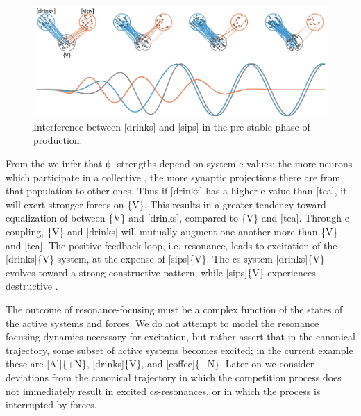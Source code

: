   
\begin{figure}
\includegraphics[width=\textwidth]{figures/Tilsen-img52.png}
\caption{Interference between [drinks] and [sips] in the pre-stable phase of production.}
\label{fig:4:2}
\end{figure}
 

From the  we infer that ϕ{}- strengths depend on system e values: the more neurons which participate in a collective , the more synaptic projections there are from that population to other ones. Thus if [drinks] has a higher e value than [tea], it will exert stronger forces on \{V\}. This results in a greater tendency toward equalization of  between \{V\} and [drinks], compared to \{V\} and [tea]. Through e-coupling, \{V\} and [drinks] will mutually augment one another more than \{V\} and [tea]. The positive feedback loop, i.e. resonance, leads to excitation of the [drinks]\{V\} system, at the expense of [sips]\{V\}. The cs-system [drinks]\{V\} evolves toward a strong constructive  pattern, while [sips]\{V\} experiences destructive .

The outcome of resonance-focusing must be a complex function of the states of the active systems and  forces. We do not attempt to model the resonance focusing dynamics necessary for excitation, but rather assert that in the canonical trajectory, some subset of active systems becomes excited; in the current example these are [Al]\{+N\}, [drinks]\{V\}, and [coffee]\{−N\}. Later on we consider deviations from the canonical trajectory in which the competition process does not immediately result in excited cs-resonances, or in which the process is interrupted by  forces.

